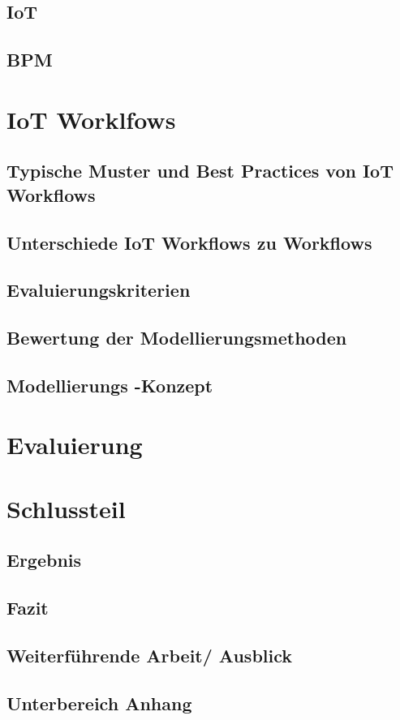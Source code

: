 \documentclass[a4paper, 12pt, twoside, headsepline=true]{scrartcl} %
\begin{document}
\subsection{IoT}

\subsection{BPM}

\newpage


\section{IoT Worklfows}

\subsection{Typische Muster und Best Practices von IoT Workflows}

\subsection{Unterschiede IoT Workflows zu Workflows}

\subsection{Evaluierungskriterien}

\subsection{Bewertung der Modellierungsmethoden}

\subsection{ Modellierungs -Konzept}

\newpage

\section{Evaluierung}

\newpage

\section{Schlussteil}

\subsection{Ergebnis}

\subsection{Fazit}

\subsection{Weiterführende Arbeit/ Ausblick}

\newpage

\printbibliography[heading=none]
\newpage
{}
\subsection*{Unterbereich Anhang}
\end{document}
